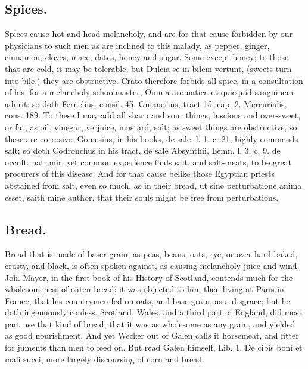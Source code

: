 {\subsection{Spices.}
Spices cause hot and head melancholy, and are for that cause
forbidden by our physicians to such men as are inclined to this malady,
as pepper, ginger, cinnamon, cloves, mace, dates, \etc{} honey and sugar.
 Some except honey; to those that are cold, it may be tolerable,
but  Dulcia se in bilem vertunt, (sweets turn into bile,) they
are obstructive. Crato therefore forbids all spice, in a consultation
of his, for a melancholy schoolmaster, Omnia aromatica et quicquid
sanguinem adurit: so doth Fernelius, consil. 45. Guianerius, tract 15.
cap. 2. Mercurialis, cons. 189. To these I may add all sharp and sour
things, luscious and over-sweet, or fat, as oil, vinegar, verjuice,
mustard, salt; as sweet things are obstructive, so these are corrosive.
Gomesius, in his books, de sale, l. 1. c. 21, highly commends salt; so
doth Codronchus in his tract, de sale Absynthii, Lemn. l. 3. c. 9. de
occult. nat. mir. yet common experience finds salt, and salt-meats, to
be great procurers of this disease. And for that cause belike those
Egyptian priests abstained from salt, even so much, as in their bread,
ut sine perturbatione anima esset, saith mine author, that their souls
might be free from perturbations.
\subsection{Bread.}
Bread that is made of baser grain, as peas, beans, oats, rye,
or over-hard baked, crusty, and black, is often spoken against,
as causing melancholy juice and wind. Joh. Mayor, in the first book of
his History of Scotland, contends much for the wholesomeness of oaten
bread: it was objected to him then living at Paris in France, that his
countrymen fed on oats, and base grain, as a disgrace; but he doth
ingenuously confess, Scotland, Wales, and a third part of England, did
most part use that kind of bread, that it was as wholesome as any
grain, and yielded as good nourishment. And yet Wecker out of Galen
calls it horsemeat, and fitter for juments than men to feed on. But
read Galen himself, Lib. 1. De cibis boni et mali succi, more largely
discoursing of corn and bread.
}
